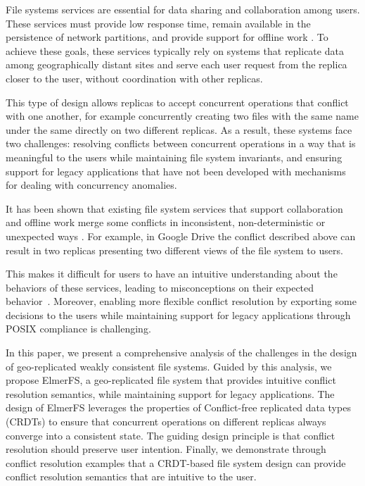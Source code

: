 \documentclass[sigconf,anonymous,10pt]{acmart}
\begin{document}

File systems services are essential for data sharing and collaboration among users.
These services must provide low response time, remain available in the persistence
of network partitions, and provide support for offline work \cite{howard1988scale}.
To achieve these goals, these services typically rely on systems that replicate
data among geographically distant sites and serve each user request from the replica
closer to the user, without coordination with other replicas.

This type of design allows replicas to accept concurrent operations that conflict
with one another, for example concurrently creating two files with the same name
under the same directly on two different replicas.
As a result, these systems face two challenges:
resolving conflicts between concurrent operations in a way that is meaningful to
the users while maintaining file system invariants,
and ensuring support for legacy applications that have not been developed with
mechanisms for dealing with concurrency anomalies.

It has been shown that existing file system services that support collaboration
and offline work merge some conflicts in inconsistent, non-deterministic or
unexpected ways \cite{cai2018some, taothanh:tel-01673030}.
For example, in Google Drive the conflict described above can result in two
replicas presenting two different views of the file system to users.

This makes it difficult for users to have an intuitive understanding about
the behaviors of these services,
leading to misconceptions on their expected behavior~\cite{tang2013you}.
Moreover, enabling more flexible conflict resolution by exporting some decisions
to the users while maintaining support for legacy applications through POSIX
compliance is challenging.

In this paper, we present a comprehensive analysis of the challenges in the
design of geo-replicated weakly consistent file systems.
Guided by this analysis, we propose ElmerFS,
a geo-replicated file system that provides intuitive conflict resolution
semantics, while maintaining support for legacy applications.
The design of ElmerFS leverages the properties of Conflict-free replicated data
types (CRDTs) to ensure that concurrent operations on different replicas always
converge into a consistent state.
The guiding design principle is that conflict resolution should preserve user
intention.
Finally, we demonstrate through conflict resolution examples that a CRDT-based
file system design can provide conflict resolution semantics that are intuitive
to the user.
\end{document}
